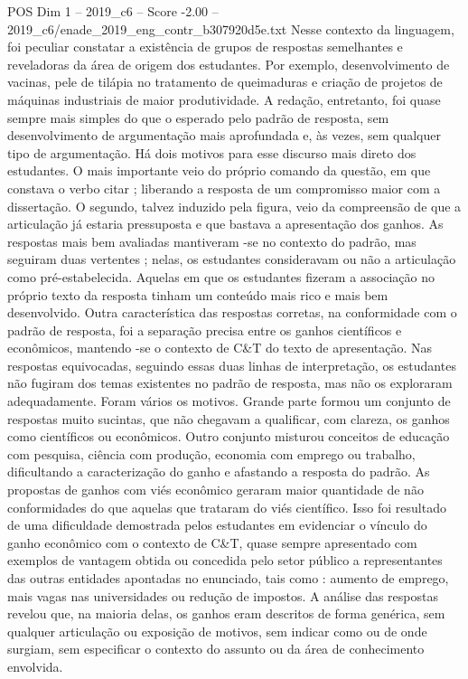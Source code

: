 \begin{textsample}{POS Dim 1 – 2019\_c6 – Score -2.00 – 2019\_c6/enade\_2019\_eng\_contr\_b307920d5e.txt}
Nesse contexto da linguagem, foi peculiar constatar a existência de grupos de respostas semelhantes e reveladoras da área de origem dos estudantes.
Por exemplo, desenvolvimento de vacinas, pele de tilápia no tratamento de queimaduras e criação de projetos de máquinas industriais de maior produtividade.
A redação, entretanto, foi quase sempre mais simples do que o esperado pelo padrão de resposta, sem desenvolvimento de argumentação mais aprofundada e, às vezes, sem qualquer tipo de argumentação.
Há dois motivos para esse discurso mais direto dos estudantes.
O mais importante veio do próprio comando da questão, em que constava o verbo citar ; liberando a resposta de um compromisso maior com a dissertação.
O segundo, talvez induzido pela figura, veio da compreensão de que a articulação já estaria pressuposta e que bastava a apresentação dos ganhos.
As respostas mais bem avaliadas mantiveram -se no contexto do padrão, mas seguiram duas vertentes ; nelas, os estudantes consideravam ou não a articulação como pré-estabelecida.
Aquelas em que os estudantes fizeram a associação no próprio texto da resposta tinham um conteúdo mais rico e mais bem desenvolvido.
Outra característica das respostas corretas, na conformidade com o padrão de resposta, foi a separação precisa entre os ganhos científicos e econômicos, mantendo -se o contexto de C\&T do texto de apresentação.
Nas respostas equivocadas, seguindo essas duas linhas de interpretação, os estudantes não fugiram dos temas existentes no padrão de resposta, mas não os exploraram adequadamente.
Foram vários os motivos.
Grande parte formou um conjunto de respostas muito sucintas, que não chegavam a qualificar, com clareza, os ganhos como científicos ou econômicos.
Outro conjunto misturou conceitos de educação com pesquisa, ciência com produção, economia com emprego ou trabalho, dificultando a caracterização do ganho e afastando a resposta do padrão.
As propostas de ganhos com viés econômico geraram maior quantidade de não conformidades do que aquelas que trataram do viés científico.
Isso foi resultado de uma dificuldade demostrada pelos estudantes em evidenciar o vínculo do ganho econômico com o contexto de C\&T, quase sempre apresentado com exemplos de vantagem obtida ou concedida pelo setor público a representantes das outras entidades apontadas no enunciado, tais como : aumento de emprego, mais vagas nas universidades ou redução de impostos.
A análise das respostas revelou que, na maioria delas, os ganhos eram descritos de forma genérica, sem qualquer articulação ou exposição de motivos, sem indicar como ou de onde surgiam, sem especificar o contexto do assunto ou da área de conhecimento envolvida.

\end{textsample}
